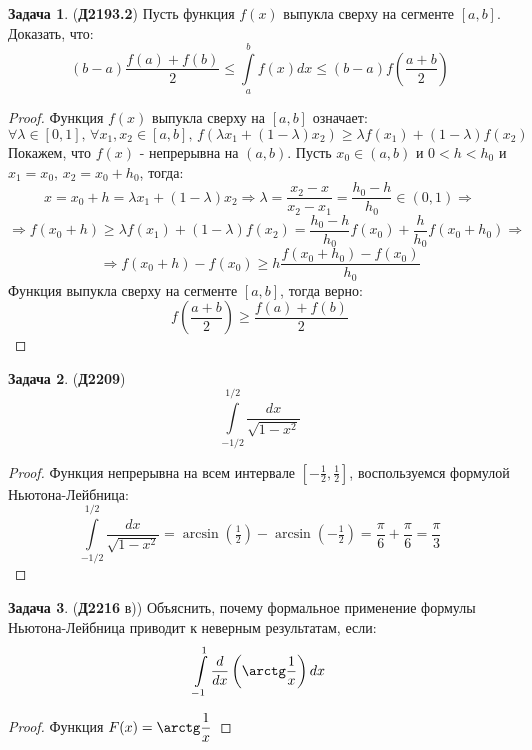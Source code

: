 \documentclass[12pt]{article}
\theoremstyle{definition}
\newtheorem{problem}{Задача}
\newcommand{\ddint}[2]{\displaystyle\int\limits_{#1}^{#2}}
\begin{document}
\begin{problem}(\textbf{Д2193.2})
	Пусть функция $f(x)$ выпукла сверху на сегменте $[a,b]$. Доказать, что:
	$$
		(b-a)\dfrac{f(a) + f(b)}{2} \leq \ddint{a}{b}f(x)dx \leq (b-a)f\left(\dfrac{a+b}{2}\right)
	$$
\end{problem}
\begin{proof}
	Функция $f(x)$ выпукла сверху на $[a,b]$ означает:
	$$
		\forall \lambda \in [0,1], \, \forall x_1,x_2 \in [a,b], \, f(\lambda x_1 + (1-\lambda)x_2) \geq \lambda f(x_1) + (1-\lambda)f(x_2)
	$$
	Покажем, что $f(x)$ - непрерывна на $(a,b)$. Пусть $x_0 \in (a,b)$ и $0 < h < h_0$ и $x_1 = x_0, \, x_2 = x_0 + h_0$, тогда:
	$$
		x = x_0 + h = \lambda x_1 + (1-\lambda)x_2 \Rightarrow \lambda = \dfrac{x_2 - x}{x_2 - x_1} = \dfrac{h_0 - h}{h_0} \in (0,1) \Rightarrow
	$$
	$$
		\Rightarrow f(x_0 + h) \geq \lambda f(x_1) + (1-\lambda)f(x_2) = \dfrac{h_0 - h}{h_0}f(x_0) + \dfrac{h}{h_0}f(x_0 + h_0) \Rightarrow 
	$$
	$$
		\Rightarrow f(x_0 + h) - f(x_0) \geq h\dfrac{f(x_0 + h_0) - f(x_0)}{h_0}
	$$
	Функция выпукла сверху на сегменте $[a,b]$, тогда верно:
	$$
		f\left(\dfrac{a + b}{2}\right) \geq \dfrac{f(a) + f(b)}{2}
	$$
\end{proof}


\begin{problem}(\textbf{Д2209})
	$$
		\ddint{-1/2}{1/2}\dfrac{dx}{\sqrt{1-x^2}}
	$$
\end{problem}
\begin{proof}
	Функция непрерывна на всем интервале $\left[-\tfrac{1}{2},\tfrac{1}{2}\right]$, воспользуемся формулой Ньютона-Лейбница:
	$$
		\ddint{-1/2}{1/2}\dfrac{dx}{\sqrt{1-x^2}} = \arcsin\left(\tfrac{1}{2}\right) - \arcsin\left(-\tfrac{1}{2}\right) =\dfrac{\pi}{6} + \dfrac{\pi}{6} = \dfrac{\pi}{3}
	$$
\end{proof}

\begin{problem}(\textbf{Д2216} в))
	Объяснить, почему формальное применение формулы Ньютона-Лейбница приводит к неверным результатам, если:
	$$
		\ddint{-1}{1}\dfrac{d}{dx}\left(\arctg\dfrac{1}{x}\right)dx
	$$
\end{problem}
\begin{proof}
	Функция $F(x) = \arctg\dfrac{1}{x}$
\end{proof}
\end{document}
